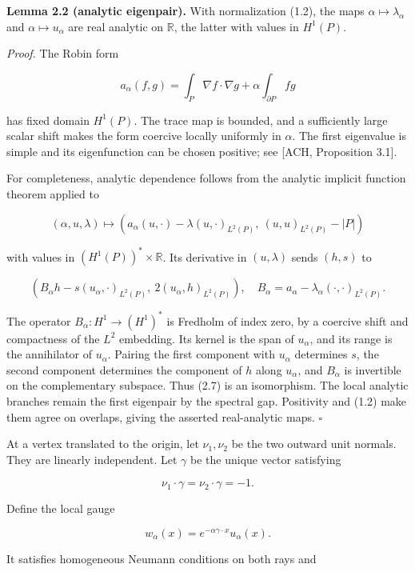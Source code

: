\documentclass[11pt]{article}
\begin{document}
\textbf{Lemma 2.2 (analytic eigenpair).} With normalization (1.2), the
maps \(\alpha\mapsto\lambda_\alpha\) and \(\alpha\mapsto u_\alpha\) are
real analytic on \(\mathbb R\), the latter with values in \(H^1(P)\).

\emph{Proof.} The Robin form

\[
a_\alpha(f,g)=\int_P\nabla f\cdot\nabla g
+\alpha\int_{\partial P}fg
\tag{2.5}
\]

has fixed domain \(H^1(P)\). The trace map is bounded, and a
sufficiently large scalar shift makes the form coercive locally
uniformly in \(\alpha\). The first eigenvalue is simple and its
eigenfunction can be chosen positive; see {[}ACH, Proposition 3.1{]}.

For completeness, analytic dependence follows from the analytic implicit
function theorem applied to

\[
(\alpha,u,\lambda)\longmapsto
\left(a_\alpha(u,\cdot)-\lambda(u,\cdot)_{L^2(P)},
\ (u,u)_{L^2(P)}-|P|\right)
\tag{2.6}
\]

with values in \((H^1(P))^*\times\mathbb R\). Its derivative in
\((u,\lambda)\) sends \((h,s)\) to

\[
\left(B_\alpha h-s(u_\alpha,\cdot)_{L^2(P)},
\ 2(u_\alpha,h)_{L^2(P)}\right),
\quad B_\alpha=a_\alpha-\lambda_\alpha(\cdot,\cdot)_{L^2(P)}.
\tag{2.7}
\]

The operator \(B_\alpha:H^1\to(H^1)^*\) is Fredholm of index zero, by a
coercive shift and compactness of the \(L^2\) embedding. Its kernel is
the span of \(u_\alpha\), and its range is the annihilator of
\(u_\alpha\). Pairing the first component with \(u_\alpha\) determines
\(s\), the second component determines the component of \(h\) along
\(u_\alpha\), and \(B_\alpha\) is invertible on the complementary
subspace. Thus (2.7) is an isomorphism. The local analytic branches
remain the first eigenpair by the spectral gap. Positivity and (1.2)
make them agree on overlaps, giving the asserted real-analytic maps. \(\square\)

At a vertex translated to the origin, let \(\nu_1,\nu_2\) be the two
outward unit normals. They are linearly independent. Let \(\gamma\) be
the unique vector satisfying

\[
\nu_1\cdot\gamma=\nu_2\cdot\gamma=-1.
\tag{2.8}
\]

Define the local gauge

\[
w_\alpha(x)=e^{-\alpha\gamma\cdot x}u_\alpha(x).
\tag{2.9}
\]

It satisfies homogeneous Neumann conditions on both rays and
\end{document}
